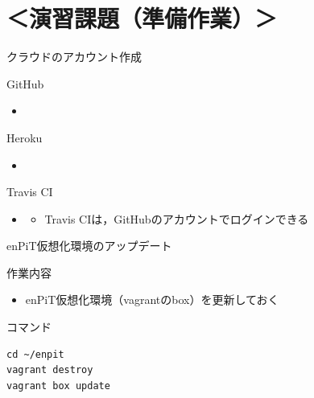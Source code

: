 \documentclass[t, aspectratio=169]{beamer}
\begin{document}
\section{＜演習課題（準備作業）＞}
\label{sec-1-5}
\begin{frame}[label=sec-1-5-1]{クラウドのアカウント作成}
\begin{block}{GitHub}
\begin{itemize}
\item{}
\end{itemize}
\end{block}
\begin{block}{Heroku}
\begin{itemize}
\item{}
\end{itemize}
\end{block}
\begin{block}{Travis CI}
\begin{itemize}
\item{}
\begin{itemize}
\item Travis CIは，GitHubのアカウントでログインできる
\end{itemize}
\end{itemize}
\end{block}
\end{frame}
\begin{frame}[fragile,label=sec-1-5-2]{enPiT仮想化環境のアップデート}
 \begin{block}{作業内容}
\begin{itemize}
\item enPiT仮想化環境（vagrantのbox）を更新しておく
\end{itemize}
\end{block}
\begin{block}{コマンド}
\begin{verbatim}
cd ~/enpit
vagrant destroy
vagrant box update
\end{verbatim}
\end{block}
\end{frame}
\end{document}
